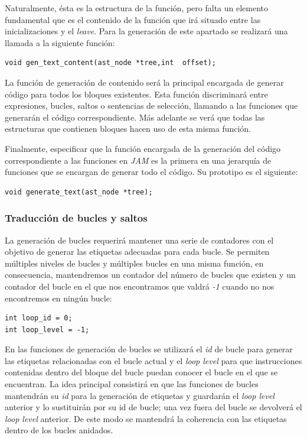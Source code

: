 \documentclass[a4paper,10pt]{article}
\begin{document}
Naturalmente, ésta es la estructura de la función, pero falta un elemento fundamental que es el contenido de la función que irá situado entre las inicializaciones y el \textit{leave}. Para la generación de este apartado se realizará una llamada a la siguiente función:

\begin{lstlisting}
void gen_text_content(ast_node *tree,int  offset);
\end{lstlisting}

La función de generación de contenido será la principal encargada de generar código para todos los bloques existentes. Esta función discriminará entre expresiones, bucles, saltos o sentencias de selección, llamando a las funciones que generarán el código correspondiente. Más adelante se verá que todas las estructuras que contienen bloques hacen uso de esta misma función.

Finalmente, especificar que la función encargada de la generación del código correspondiente a las funciones en \textit{JAM} es la primera en una jerarquía de funciones que se encargan de generar todo el código. Su prototipo es el siguiente:

\begin{lstlisting}
void generate_text(ast_node *tree);
\end{lstlisting}

\subsubsection{Traducción de bucles y saltos}
La generación de bucles requerirá mantener una serie de contadores con el objetivo de generar las etiquetas adecuadas para cada bucle. Se permiten múltiples niveles de bucles y múltiples bucles en una misma función, en consecuencia, mantendremos un contador del número de bucles que existen y un contador del bucle en el que nos encontramos que valdrá \textit{-1} cuando no nos encontremos en ningún bucle:
\begin{lstlisting}
int loop_id = 0;
int loop_level = -1;
\end{lstlisting}

En las funciones de generación de bucles se utilizará el \textit{id} de bucle para generar las etiquetas relacionadas con el bucle actual y el \textit{loop level} para que instrucciones contenidas dentro del bloque del bucle puedan conocer el bucle en el que se encuentran. La idea principal consistirá en que las funciones de bucles mantendrán su \textit{id} para la generación de etiquetas y guardarán el \textit{loop level} anterior y lo sustituirán por su id de bucle; una vez fuera del bucle se devolverá el \textit{loop level} anterior. De este modo se mantendrá la coherencia con las etiquetas dentro de los bucles anidados.
\end{document}
